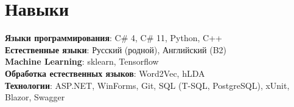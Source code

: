 \documentclass[A4,11pt]{article}
\begin{document}
\section{Навыки}
 \begin{itemize}[leftmargin=0.5cm, label={}]
    \small{\item{
     \textbf{Языки программирования}{: C\# 4, C\# 11, Python, C++} \\
     \textbf{Естественные языки}{: Русский (родной), Английский (B2)} \\
     \textbf{Machine Learning}{: sklearn, Tensorflow } \\
     \textbf{Обработка естественных языков}{: Word2Vec, hLDA } \\
     \textbf{Технологии}{: ASP.NET, WinForms, Git, SQL (T-SQL, PostgreSQL), xUnit, Blazor, Swagger } \\
    }}
 \end{itemize}
    
\end{document}
